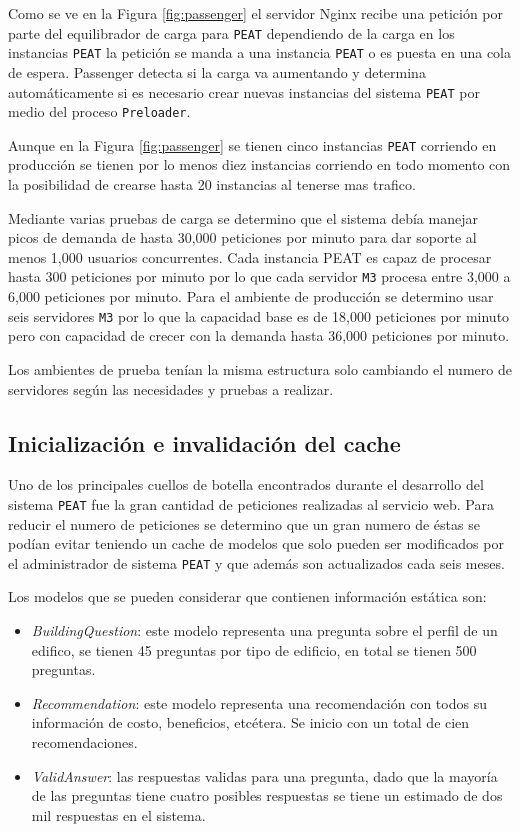 
Como se ve en la Figura \ref{fig:passenger} el servidor Nginx recibe una petición
por parte del equilibrador de carga para \texttt{PEAT} dependiendo de la carga
en los instancias \texttt{PEAT} la petición se manda a una instancia \texttt{PEAT}
o es puesta en una cola de espera. Passenger detecta si la carga va aumentando y
determina automáticamente si es necesario crear nuevas instancias del sistema
\texttt{PEAT} por medio del proceso \texttt{Preloader}.

Aunque en la Figura \ref{fig:passenger} se tienen cinco instancias \texttt{PEAT}
corriendo en producción se tienen por lo menos diez instancias corriendo en todo
momento con la posibilidad de crearse hasta 20 instancias al tenerse mas trafico.

Mediante varias pruebas de carga se determino que el sistema debía manejar picos
de demanda de hasta 30,000 peticiones por minuto para dar soporte al menos
1,000 usuarios concurrentes. Cada instancia PEAT es capaz de procesar hasta
300 peticiones por minuto por lo que cada servidor \texttt{M3} procesa entre
3,000 a 6,000 peticiones por minuto. Para el ambiente de producción se determino
usar seis servidores \texttt{M3} por lo que la capacidad base es de 18,000
peticiones por minuto pero con capacidad de crecer con la demanda hasta
36,000 peticiones por minuto.

Los ambientes de prueba tenían la misma estructura solo cambiando el numero
de servidores según las necesidades y pruebas a realizar.

\subsection{Inicialización e invalidación del cache}

Uno de los principales cuellos de botella encontrados durante el desarrollo
del sistema \texttt{PEAT} fue la gran cantidad de peticiones realizadas al
servicio web. Para reducir el numero de peticiones se determino que un gran
numero de éstas se podían evitar teniendo un cache de modelos que solo pueden
ser modificados por el administrador de sistema \texttt{PEAT} y que además
son actualizados cada seis meses. 

Los modelos que se pueden considerar que contienen información estática son:
\begin{itemize}
\item \textit{BuildingQuestion}: este modelo representa una pregunta sobre
  el perfil de un edifico, se tienen 45 preguntas por tipo de edificio, en
  total se tienen 500 preguntas.
\item \textit{Recommendation}: este modelo representa una recomendación
  con todos su información de costo, beneficios, etcétera. Se inicio con un
  total de cien recomendaciones.
\item \textit{ValidAnswer}: las respuestas validas para una pregunta, dado
  que la mayoría de las preguntas tiene cuatro posibles respuestas se tiene
  un estimado de dos mil respuestas en el sistema.
\end{itemize}

